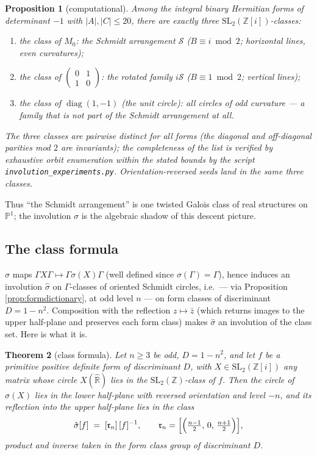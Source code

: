 \documentclass[11pt]{amsart}
\numberwithin{equation}{section}
\theoremstyle{plain}
\newtheorem{theorem}{Theorem}[section]
\newtheorem{proposition}[theorem]{Proposition}
\theoremstyle{definition}
\theoremstyle{remark}
\newcommand{\R}{\mathbb{R}}
\newcommand{\Z}{\mathbb{Z}}
\newcommand{\Zi}{\Z[i]}
\newcommand{\Rhat}{\widehat{\R}}
\newcommand{\SL}{\mathrm{SL}}
\newcommand{\Sarr}{\mathcal{S}}
\newcommand{\idealr}{\mathfrak{r}}
\begin{document}
\begin{proposition}[computational]\label{prop:threeclasses}
Among the integral binary Hermitian forms of determinant $-1$ with
$|A|, |C| \le 20$, there are exactly three
$\SL_2(\Zi)$-classes:
\begin{enumerate}
\item the class of $M_0$: the Schmidt arrangement $\Sarr$
($B \equiv i \bmod 2$; horizontal lines, even curvatures);
\item the class of $\begin{pmatrix} 0 & 1 \\ 1 & 0 \end{pmatrix}$: the
rotated family $i\Sarr$ ($B \equiv 1 \bmod 2$; vertical lines);
\item the class of $\operatorname{diag}(1, -1)$ (the unit circle): all
circles of \emph{odd} curvature --- a family that is not part of the
Schmidt arrangement at all.
\end{enumerate}
The three classes are pairwise distinct for all forms (the diagonal and
off-diagonal parities mod $2$ are invariants); the completeness of the
list is verified by exhaustive orbit enumeration within the stated
bounds by the script \texttt{involution\_\allowbreak experiments.py}.  Orientation-reversed
seeds land in the same three classes.
\end{proposition}

Thus ``the Schmidt arrangement'' is one twisted Galois class of real
structures on $\mathbb{P}^1$; the involution $\sigma$ is the algebraic
shadow of this descent picture.

\subsection{The class formula}\label{subsec:classformula}

$\sigma$ maps $\Gamma X\Gamma \mapsto \Gamma\sigma(X)\Gamma$ (well
defined since $\sigma(\Gamma) = \Gamma$), hence induces an involution
$\hat\sigma$ on $\Gamma$-classes of oriented Schmidt circles, i.e.\ ---
via Proposition \ref{prop:formdictionary}, at odd level $n$ --- on form
classes of discriminant $D = 1 - n^2$.  Composition with the reflection
$z \mapsto \bar z$ (which returns images to the upper half-plane and
preserves each form class) makes $\hat\sigma$ an involution of the
class set.  Here is what it is.

\begin{theorem}[class formula]\label{thm:classformula}
Let $n \ge 3$ be odd, $D = 1 - n^2$, and let $f$ be a primitive
positive definite form of discriminant $D$, with $X \in \SL_2(\Zi)$ any
matrix whose circle $X(\Rhat)$ lies in the $\SL_2(\Z)$-class of $f$.
Then the circle of $\sigma(X)$ lies in the lower half-plane with
reversed orientation and level $-n$, and its reflection into the upper
half-plane lies in the class
\[
  \hat\sigma[f] \;=\; [\idealr_n]\,[f]^{-1},
  \qquad
  \idealr_n = \Bigl[\Bigl(\tfrac{n-1}{2},\,0,\,\tfrac{n+1}{2}\Bigr)\Bigr],
\]
product and inverse taken in the form class group of discriminant $D$.
\end{theorem}
\end{document}
